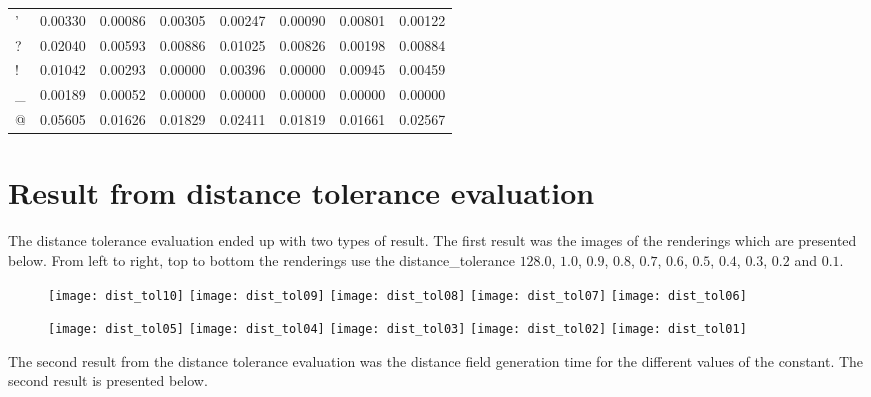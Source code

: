 \begin{tabularx}{\textwidth}{X|c|c|c|c|c|c|c}
'   & 0.00330 &  0.00086 &  0.00305 &  0.00247 &  0.00090 &  0.00801 &  0.00122 \\
?   & 0.02040 &  0.00593 &  0.00886 &  0.01025 &  0.00826 &  0.00198 &  0.00884 \\
!   & 0.01042 &  0.00293 &  0.00000 &  0.00396 &  0.00000 &  0.00945 &  0.00459 \\
\_  & 0.00189 &  0.00052 &  0.00000 &  0.00000 &  0.00000 &  0.00000 &  0.00000 \\
@   & 0.05605 &  0.01626 &  0.01829 &  0.02411 &  0.01819 &  0.01661 &  0.02567 \\ [1ex]
\end{tabularx}

\chapter{Result from distance tolerance evaluation}
The distance tolerance evaluation ended up with two types of result. The first result was the images of the renderings which are presented below. From left to right, top to bottom the renderings use the distance\_tolerance $128.0$, $1.0$, $0.9$, $0.8$, $0.7$, $0.6$, $0.5$, $0.4$, $0.3$, $0.2$ and  $0.1$.

\begin{figure}[H]
  \texttt{[image: dist\_tol10]}
\endminipage\hfill
{}
  \texttt{[image: dist\_tol09]}
\endminipage\hfill
{}
  \texttt{[image: dist\_tol08]}
\endminipage\hfill
{}
  \texttt{[image: dist\_tol07]}
\endminipage\hfill
{}
  \texttt{[image: dist\_tol06]}
\endminipage\hfill
\end{figure}
\begin{figure}[H]
  \texttt{[image: dist\_tol05]}
\endminipage\hfill
{}
  \texttt{[image: dist\_tol04]}
\endminipage\hfill
{}
  \texttt{[image: dist\_tol03]}
\endminipage\hfill
{}
  \texttt{[image: dist\_tol02]}
\endminipage\hfill
{}
  \texttt{[image: dist\_tol01]}
\endminipage\hfill
\end{figure}

The second result from the distance tolerance evaluation was the distance field generation time for the different values of the constant. The second result is presented below.

